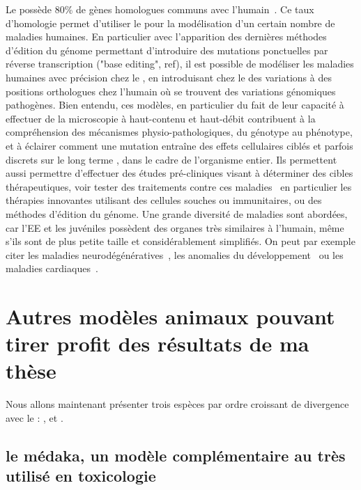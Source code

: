 \documentclass[\main/main.tex]{subfiles}
\begin{document}
%
Le \pz{} possède 80\% de gènes homologues communs avec l'humain~\cite{howe_2013}. 
Ce taux d'homologie permet d'utiliser le \pz{} pour la modélisation d'un certain nombre de maladies humaines.
En particulier avec l'apparition des dernières méthodes d'édition du génome permettant d'introduire des mutations ponctuelles par réverse transcription ("base editing", ref), il est possible de modéliser les maladies humaines avec précision chez le \pz{}, en introduisant chez le \pz{} des variations à des positions orthologues chez l'humain où se trouvent des variations génomiques pathogènes.
Bien entendu, ces modèles, en particulier du fait de leur capacité à effectuer de la microscopie à haut-contenu et haut-débit contribuent à la compréhension des mécanismes physio-pathologiques, du génotype au phénotype, et à éclairer comment une mutation entraîne des effets cellulaires ciblés et parfois discrets sur le long terme , dans le cadre de l'organisme entier.
Ils permettent aussi permettre d'effectuer des études pré-cliniques visant à déterminer des cibles thérapeutiques, voir tester des traitements contre ces maladies~\cite{vaz_2018,pitchai_2019,saleem_2018} en particulier les thérapies innovantes utilisant des cellules souches ou immunitaires, ou des méthodes d'édition du génome. 
%
Une grande diversité de maladies sont abordées, car l'EE et les juvéniles possèdent des organes très similaires à l'humain, même s'ils sont de plus petite taille et considérablement simplifiés. On peut par exemple citer les maladies neurodégénératives~\cite{fontana_2018}, les anomalies du développement~\cite{lovely_2016,sarmah_2016} ou les maladies cardiaques~\cite{brown_2016, walcott_2014}.

\section{Autres modèles animaux\label{sec:intro:modele} pouvant tirer profit des résultats de ma thèse}

Nous allons maintenant présenter trois espèces par ordre croissant de divergence avec le \pz{}: \ol, \xl{} et \mm{}.

    \subsection{\label{sec:medaka}le médaka, un modèle complémentaire au \pz{} très utilisé en toxicologie}
    
\end{document}
